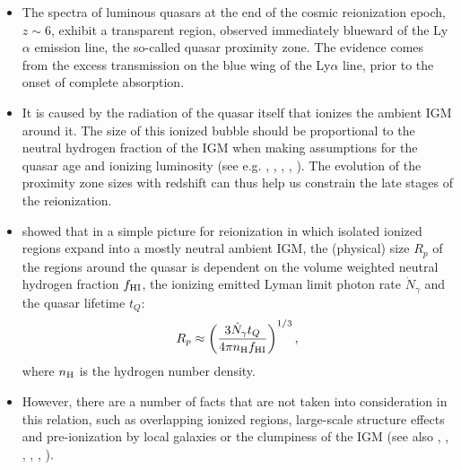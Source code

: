 \documentclass[iop]{emulateapj}
\newcommand{\lya} {Ly$\alpha$\xspace}
\newcommand{\hii} {\ion{H}{2}\xspace}
\begin{document}
\begin{itemize}
\item The spectra of luminous quasars at the end of the cosmic reionization epoch, $z\sim 6$, exhibit a transparent region, observed immediately blueward of the \lya emission line, the so-called quasar proximity zone. The evidence comes from the excess transmission on the blue wing of the \lya line, prior to the onset of complete absorption. 
\item It is caused by the radiation of the quasar itself that ionizes the ambient IGM around it. The size of this ionized \hii bubble should be proportional to the neutral hydrogen fraction of the IGM when making assumptions for the quasar age and ionizing luminosity (see e.g. \citet{MadauRees2000}, \citet{CenHaiman2000}, \citet{BoltonHaehnelt2007}, \citet{BoltonHaehnelt2006}, \citet{Keating2015}). The evolution of the proximity zone sizes with redshift can thus help us constrain the late stages of the reionization. %
\item \citet{Maselli2007} showed that in a simple picture for reionization in which isolated ionized \hii regions expand into a mostly neutral ambient IGM, the (physical) size $R_p$ of the \hii regions around the quasar is dependent on the volume weighted neutral hydrogen fraction $f_{\rm HI}$, the ionizing emitted Lyman limit photon rate $\dot{N}_{\gamma}$ and the quasar lifetime $t_Q$:
\begin{align}
R_p\approx\left(\frac{3\dot{N}_{\gamma}t_Q}{4\pi n_{\rm H}f_{\rm HI}}\right)^{1/3}, 
\end{align}
where $n_{\rm H}$ is the hydrogen number density. 
\item However, there are a number of facts that are not taken into consideration in this relation, such as overlapping ionized \hii regions, large-scale structure effects and pre-ionization by local galaxies or the clumpiness of the IGM (see also \citet{Fan2006}, \citet{BoltonHaehnelt2007}, \citet{BoltonHaehnelt2006}, \citet{Lidz2007}, \citet{Maselli2007}, \citet{Maselli2009}). 

\end{itemize}
\end{document}
